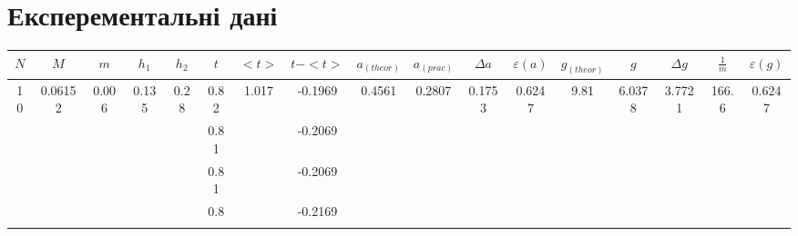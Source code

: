 \documentclass[a4paper,12pt]{article}
\begin{document}
\section{Експерементальні дані}
\begin{landscape}
\begin{table}[]
\begin{tabular}{|c|c|c|c|c|c|c|c|c|c|c|c|c|c|c|c|c|}
\hline
$N$                  & $M$                       & $m$                     & $h_1$                   & $h_2$                  & $t$  & $<t>$                   & $t-<t>$ & $a_{(theor)}$               & $a_{(prac)}$                & $\Delta a$                & $\varepsilon(a)$          & $g_{(theor)}$             & $g$                       & $\Delta g$                & $\frac 1m$                 & $\varepsilon(g)$          \\ \hline
\multirow{20}{*}{10} & \multirow{20}{*}{0.06152} & \multirow{20}{*}{0.006} & \multirow{10}{*}{0.135} & \multirow{10}{*}{0.28} & 0.82 & \multirow{20}{*}{1.017} & -0.1969 & \multirow{20}{*}{0.4561} & \multirow{10}{*}{0.2807} & \multirow{10}{*}{0.1753}  & \multirow{10}{*}{0.6247}  & \multirow{20}{*}{9.81} & \multirow{10}{*}{6.0378}  & \multirow{10}{*}{3.7721}  & \multirow{20}{*}{166.6} & \multirow{10}{*}{0.6247}  \\ \cline{6-6} \cline{8-8}
                     &                           &                         &                         &                        & 0.81 &                         & -0.2069 &                          &                          &                           &                           &                        &                           &                           &                            &                           \\ \cline{6-6} \cline{8-8}
                     &                           &                         &                         &                        & 0.81 &                         & -0.2069 &                          &                          &                           &                           &                        &                           &                           &                            &                           \\ \cline{6-6} \cline{8-8}
                     &                           &                         &                         &                        & 0.8  &                         & -0.2169 &                          &                          &                           &                           &                        &                           &                           &                            &                           \\ \cline{6-6} \cline{8-8}

\end{tabular}
\end{table}
\end{landscape}
\end{document}
